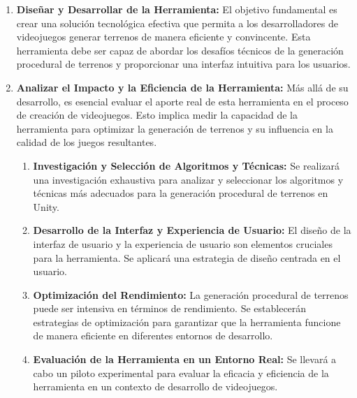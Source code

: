 \begin{enumerate}
    \item \textbf{Diseñar y Desarrollar de la Herramienta:} El objetivo fundamental es crear una solución tecnológica efectiva que permita a los desarrolladores de videojuegos generar terrenos de manera eficiente y convincente. Esta herramienta debe ser capaz de abordar los desafíos técnicos de la generación procedural de terrenos y proporcionar una interfaz intuitiva para los usuarios. 

    \item \textbf{Analizar el Impacto y la Eficiencia de la Herramienta:} Más allá de su desarrollo, es esencial evaluar el aporte real de esta herramienta en el proceso de creación de videojuegos. Esto implica medir la capacidad de la herramienta para optimizar la generación de terrenos y su influencia en la calidad de los juegos resultantes.

    \begin{enumerate}[label=\Alph*)]
        \item \textbf{Investigación y Selección de Algoritmos y Técnicas:} Se realizará una investigación exhaustiva para analizar y seleccionar los algoritmos y técnicas más adecuados para la generación procedural de terrenos en Unity.

        \item \textbf{Desarrollo de la Interfaz y Experiencia de Usuario:} El diseño de la interfaz de usuario y la experiencia de usuario son elementos cruciales para la herramienta. Se aplicará una estrategia de diseño centrada en el usuario.

        \item \textbf{Optimización del Rendimiento:} La generación procedural de terrenos puede ser intensiva en términos de rendimiento. Se establecerán estrategias de optimización para garantizar que la herramienta funcione de manera eficiente en diferentes entornos de desarrollo.

        \item \textbf{Evaluación de la Herramienta en un Entorno Real:} Se llevará a cabo un piloto experimental para evaluar la eficacia y eficiencia de la herramienta en un contexto de desarrollo de videojuegos.
    \end{enumerate}
\end{enumerate}

\newpage

